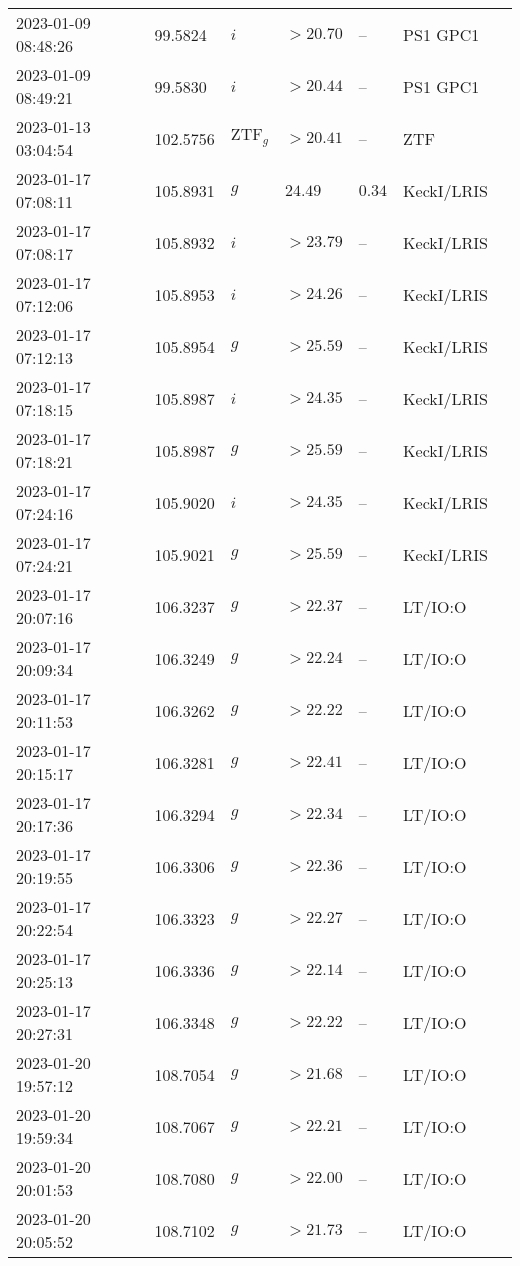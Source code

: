 \documentclass{nature_plusfigure}
\begin{document}
\begin{supplement}
\begin{center}
\begin{longtable}{lllllll}
2023-01-09 08:48:26 & 99.5824 & $i$ & $>20.70$ & -- & PS1 GPC1 &  \\ 
2023-01-09 08:49:21 & 99.5830 & $i$ & $>20.44$ & -- & PS1 GPC1 &  \\ 
2023-01-13 03:04:54 & 102.5756 & $\mathrm{ZTF}_{g}$ & $>20.41$ & -- & ZTF &  \\ 
2023-01-17 07:08:11 & 105.8931 & $g$ & $24.49$ & $0.34$ & KeckI/LRIS &  \\ 
2023-01-17 07:08:17 & 105.8932 & $i$ & $>23.79$ & -- & KeckI/LRIS &  \\ 
2023-01-17 07:12:06 & 105.8953 & $i$ & $>24.26$ & -- & KeckI/LRIS &  \\ 
2023-01-17 07:12:13 & 105.8954 & $g$ & $>25.59$ & -- & KeckI/LRIS &  \\ 
2023-01-17 07:18:15 & 105.8987 & $i$ & $>24.35$ & -- & KeckI/LRIS &  \\ 
2023-01-17 07:18:21 & 105.8987 & $g$ & $>25.59$ & -- & KeckI/LRIS &  \\ 
2023-01-17 07:24:16 & 105.9020 & $i$ & $>24.35$ & -- & KeckI/LRIS &  \\ 
2023-01-17 07:24:21 & 105.9021 & $g$ & $>25.59$ & -- & KeckI/LRIS &  \\ 
2023-01-17 20:07:16 & 106.3237 & $g$ & $>22.37$ & -- & LT/IO:O &  \\ 
2023-01-17 20:09:34 & 106.3249 & $g$ & $>22.24$ & -- & LT/IO:O &  \\ 
2023-01-17 20:11:53 & 106.3262 & $g$ & $>22.22$ & -- & LT/IO:O &  \\ 
2023-01-17 20:15:17 & 106.3281 & $g$ & $>22.41$ & -- & LT/IO:O &  \\ 
2023-01-17 20:17:36 & 106.3294 & $g$ & $>22.34$ & -- & LT/IO:O &  \\ 
2023-01-17 20:19:55 & 106.3306 & $g$ & $>22.36$ & -- & LT/IO:O &  \\ 
2023-01-17 20:22:54 & 106.3323 & $g$ & $>22.27$ & -- & LT/IO:O &  \\ 
2023-01-17 20:25:13 & 106.3336 & $g$ & $>22.14$ & -- & LT/IO:O &  \\ 
2023-01-17 20:27:31 & 106.3348 & $g$ & $>22.22$ & -- & LT/IO:O &  \\ 
2023-01-20 19:57:12 & 108.7054 & $g$ & $>21.68$ & -- & LT/IO:O &  \\ 
2023-01-20 19:59:34 & 108.7067 & $g$ & $>22.21$ & -- & LT/IO:O &  \\ 
2023-01-20 20:01:53 & 108.7080 & $g$ & $>22.00$ & -- & LT/IO:O &  \\ 
2023-01-20 20:05:52 & 108.7102 & $g$ & $>21.73$ & -- & LT/IO:O &  \\ 

\end{longtable}
\end{center}
\end{supplement}
\end{document}
